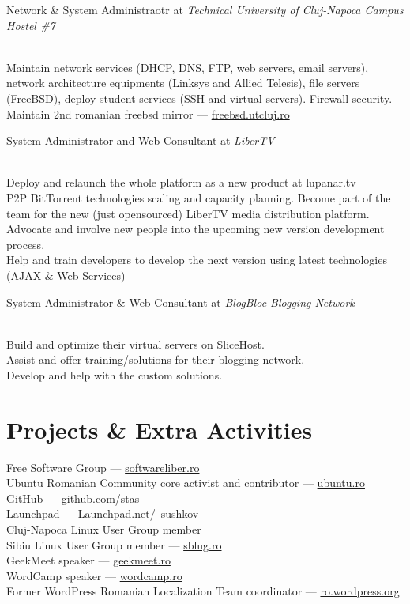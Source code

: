 \documentclass[10pt, a4paper]{article}
\newcommand{\years}[1]{\marginnote{\scriptsize #1}}
\begin{document}
\years{2008-2009}Network \& System Administraotr at \emph{Technical University of Cluj-Napoca Campus Hostel \#7}
\begin{footnotesize}
\\
Maintain network services (DHCP, DNS, FTP, web servers, email servers), network architecture equipments (Linksys and Allied Telesis), file servers (FreeBSD), deploy student services (SSH and virtual servers). Firewall security.\\
Maintain 2nd romanian freebsd mirror --- \href{http://freebsd.utcluj.ro}{freebsd.utcluj.ro}
\end{footnotesize}

\years{2008-2009}System Administrator and Web Consultant at \emph{LiberTV}
\begin{footnotesize}
\\
Deploy and relaunch the whole platform as a new product at lupanar.tv\\
P2P BitTorrent technologies scaling and capacity planning.
Become part of the team for the new (just opensourced) LiberTV media distribution platform.\\
Advocate and involve new people into the upcoming new version development process.\\
Help and train developers to develop the next version using latest technologies (AJAX \& Web Services)
\end{footnotesize}

\years{2008}System Administrator \& Web Consultant at \emph{BlogBloc Blogging Network}
\begin{footnotesize}
\\
Build and optimize their virtual servers on SliceHost.\\
Assist and offer training/solutions for their blogging network.\\
Develop and help with the custom solutions.
\end{footnotesize}

\pagebreak

\section*{Projects \& Extra Activities}
Free Software Group --- \href{http://softwareliber.ro}{softwareliber.ro}\\
Ubuntu Romanian Community core activist and contributor --- \href{http://ubuntu.ro}{ubuntu.ro}\\
GitHub --- \href{http://github.com/stas/}{github.com/stas}\\
Launchpad --- \href{http://launchpad.net/~sushkov}{Launchpad.net/~sushkov}\\
Cluj-Napoca Linux User Group member\\
Sibiu Linux User Group member --- \href{http://sblug.ro}{sblug.ro}\\
GeekMeet speaker --- \href{http://geekmeet.ro}{geekmeet.ro}\\
WordCamp speaker --- \href{http://wordcamp.ro}{wordcamp.ro}\\
Former WordPress Romanian Localization Team coordinator --- \href{http://ro.wordpress.org}{ro.wordpress.org}\\
\end{document}
